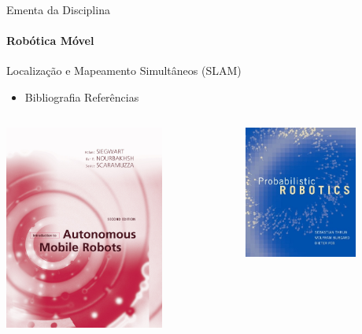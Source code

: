 \documentclass{beamer}
\begin{document}
\begin{frame}[c]{Ementa da Disciplina}
	\framesubtitle{Robótica Móvel}
	\begin{block}{Localização e Mapeamento Simultâneos (SLAM)}
	\end{block}
	\begin{itemize}
		\item Bibliografia Referências
	\end{itemize}
	\begin{columns}[c]
		\begin{column}{0.5\textwidth}
			\center
			\includegraphics[width=0.7\textwidth]{./images/livro1}
		\end{column}
		\begin{column}{0.5\textwidth}
			\center
			\includegraphics[width=0.7\textwidth]{./images/livro2}
		\end{column}
	\end{columns}
\end{frame}
\end{document}
